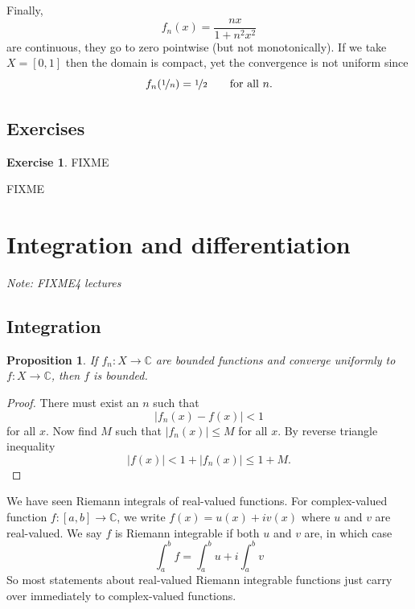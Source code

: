 \documentclass[12pt]{book}
\newcommand{\abs}[1]{\left\lvert {#1} \right\rvert}
\newcommand{\C}{{\mathbb{C}}}
\newcommand{\sectionnotes}[1]{\noindent \emph{Note: #1} \medskip \par}
\newcommand{\sectionnewpage}{\clearpage}
\theoremstyle{plain}
\newtheorem{prop}[thm]{Proposition}
\theoremstyle{remark}
\theoremstyle{definition}
\theoremstyle{exercise}
\newtheorem{exercise}{Exercise}[section]
\theoremstyle{example}
\begin{document}
Finally,
\begin{equation*}
f_n(x) = \frac{nx}{1+n^2x^2}
\end{equation*}
are continuous, they go to zero pointwise (but not monotonically).  If we
take $X=[0,1]$ then the domain is compact, yet the convergence is not uniform
since
\begin{equation*}
f_n(\nicefrac{1}{n}) = \nicefrac{1}{2} \qquad \text{for all $n$.}
\end{equation*}

\subsection{Exercises}

\begin{exercise}
FIXME
\end{exercise}

FIXME


\sectionnewpage
\section{Integration and differentiation}
\label{sec:FIXME}

\sectionnotes{FIXME4 lectures}

\subsection{Integration}

\begin{prop}
If $f_n \colon X \to \C$ are bounded functions and converge uniformly to $f
\colon X \to \C$, then $f$ is bounded.
\end{prop}

\begin{proof}
There must exist an $n$ such that
\begin{equation*}
\abs{f_n(x)-f(x)} < 1
\end{equation*}
for all $x$.
Now find $M$ such that $\abs{f_n(x)} \leq M$ for all $x$.
By reverse triangle inequality
\begin{equation*}
\abs{f(x)} < 1+ \abs{f_n(x)} \leq 1+M .
\end{equation*}
\end{proof}

\medskip

We have seen Riemann integrals of real-valued functions.  For complex-valued
function $f \colon [a,b] \to \C$, we write $f(x) = u(x) + iv(x)$
where $u$ and $v$ are real-valued.  We say $f$ is Riemann integrable
if both $u$ and $v$ are, in which case
$$
\int_a^b f = \int_a^b u + i \int_a^b v
$$
So most statements about real-valued Riemann integrable functions just
carry over immediately to complex-valued functions.
\end{document}
